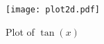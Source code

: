 \begin{figure}[H] 
  \centering
  \texttt{[image: plot2d.pdf]}
  \caption{Plot of $\tan(x)$}
\end{figure}
